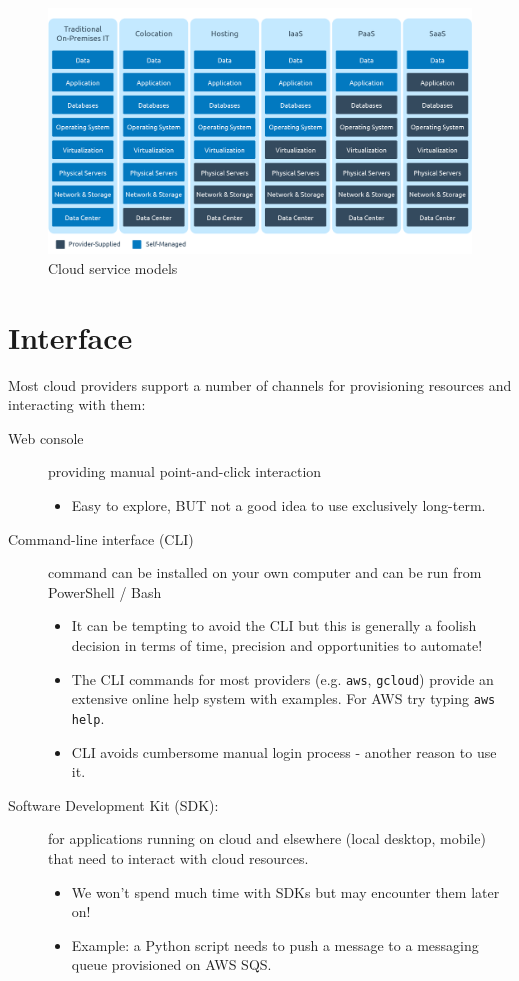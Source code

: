 \documentclass{pgnotes}
\begin{document}
\begin{figure}[htbp]
 \centering
 \includegraphics[width=1.0\linewidth]{cloud_service_models}
 \caption{Cloud service models}
 \label{fig:cloud-service-models}
\end{figure}

\section{Interface}
\label{sec:interface}

Most cloud providers support a number of channels for provisioning resources and interacting with them: 

\begin{description}
\item[Web console] providing manual point-and-click interaction
  \begin{itemize}
  \item Easy to explore, BUT not a good idea to use exclusively long-term.
  \end{itemize}
\item[Command-line interface (CLI)] command can be installed on your own computer and can be run from PowerShell / Bash
  \begin{itemize}
  \item It can be tempting to avoid the CLI but this is generally a foolish decision in terms of time, precision and opportunities to automate!
  \item The CLI commands for most providers (e.g. \texttt{aws}, \texttt{gcloud}) provide an extensive online help system with examples. For AWS try typing \texttt{aws help}.
  \item CLI avoids cumbersome manual login process - another reason to use it.
  \end{itemize}
\item[Software Development Kit (SDK):] for applications running on cloud and elsewhere (local desktop, mobile) that need to interact with cloud resources.
  \begin{itemize}
  \item We won't spend much time with SDKs but may encounter them later on!
  \item Example: a Python script needs to push a message to a messaging queue provisioned on AWS SQS.
  \end{itemize}
\end{description}
\end{document}

